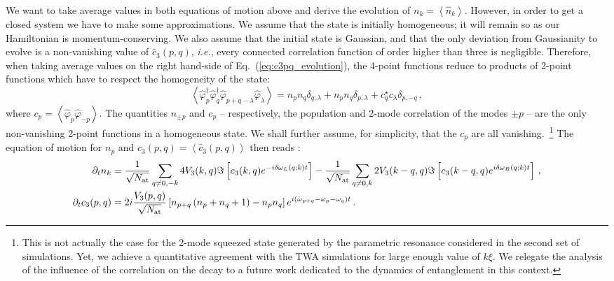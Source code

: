 \documentclass[aps,prd,notitlepage,amsfonts,amssymb,amsmath,nofootinbib,superscriptaddress,longbibliography]{revtex4-2}
\begin{document}
\begin{appendices}
We want to take average values in both equations of motion above and derive the evolution of $n_k = \left\langle \hat{n}_{k} \right\rangle$. However, in order to get a closed system we have to make some approximations. We assume that the state is initially homogeneous; it will remain so as our Hamiltonian is momentum-conserving. We also assume that the initial state is Gaussian, and that the only deviation from Gaussianity to evolve  is a non-vanishing value of $\hat{c}_{3}(p,q)$, {\it i.e.}, every connected correlation function of order higher than three is negligible. Therefore, when taking average values on the right hand-side of Eq.~(\ref{eq:c3pq_evolution}), the 4-point functions reduce to products of 2-point functions which have to respect the homogeneity of the state:
\begin{equation}
    \left \langle  \hat{\varphi}_{p}^{\dagger} \hat{\varphi}_{q}^{\dagger} \hat{\varphi}_{p+q-\lambda} \hat{\varphi}_{\lambda} \right \rangle =  n_p n_q \delta_{q, \lambda} + n_p n_q \delta_{p, \lambda} + c_q^{\star} c_{\lambda} \delta_{p, -q} \, ,
\end{equation}
where $c_p =  \left \langle  \hat{\varphi}_{p} \hat{\varphi}_{-p} \right \rangle $. The quantities $n_{\pm p}$ and $c_p$ -- respectively, the population and 2-mode correlation of the modes $\pm p$ -- are the only non-vanishing 2-point functions in a homogeneous state.  We shall further assume, for simplicity, that the $c_p$ are all vanishing.~\footnote{This is not actually the case for the 2-mode squeezed state generated by the parametric resonance considered in the second set of simulations. Yet, we achieve a quantitative agreement with the TWA simulations for large enough value of $k \xi$. We relegate the analysis of the influence of the correlation on the decay to a future work dedicated to the dynamics of entanglement in this context.} The equation of motion for $n_p$ and 
$c_{3}(p,q) =  \left \langle \hat{c}_{3}(p,q)  \right \rangle$ then reads :
\begin{align}
\begin{split}
\label{eq:reduced_syst_eom_nk_cpq}
\partial_{t} n_k & =  \frac{1}{\sqrt{N_{\rm at}}} \sum_{q \neq 0 , - k }  4 V_{3}(k,q) \Im \left[ c_{3}(k,q) e^{  - i  \delta \omega_L (q;k) t }  \right] - \frac{1}{\sqrt{N_{\rm at}}} \sum_{q \neq 0 , k  } 2 V_{3}(k-q,q) \Im \left[  c_{3}(k-q,q) e^{  i  \delta \omega_B (q;k) t }  \right]    \, , \\ 
\partial_{t} c_{3}(p,q) & =  2 i \frac{V_{3}(p,q)}{\sqrt{N_{\rm at}}}  \left[ n_{p+q} \left(n_{p}+n_{q}+1\right) - n_{p}n_{q} \right] e^{ i \left( \omega_{p+q} - \omega_{p} - \omega_{q} \right) t  } \, .

\end{split}
\end{align}
\end{appendices}
\end{document}
